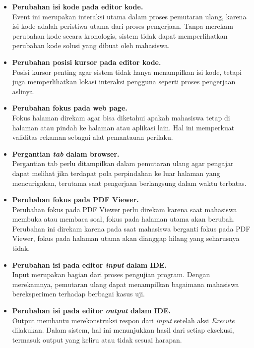 \begin{itemize}
    \item \textbf{Perubahan isi kode pada editor kode.} \\
    Event ini merupakan interaksi utama dalam proses pemutaran ulang, karena isi kode adalah peristiwa utama dari proses pengerjaan. Tanpa merekam perubahan kode secara kronologis, sistem tidak dapat memperlihatkan perubahan kode solusi yang dibuat oleh mahasiswa.

    \item \textbf{Perubahan posisi kursor pada editor kode.} \\
    Posisi kursor penting agar sistem tidak hanya menampilkan isi kode, tetapi juga memperlihatkan lokasi interaksi pengguna seperti proses pengerjaan aslinya.
      
    \item \textbf{Perubahan fokus pada web page.} \\
    Fokus halaman direkam agar bisa diketahui apakah mahasiswa tetap di halaman atau pindah ke halaman atau aplikasi lain. Hal ini memperkuat validitas rekaman sebagai alat pemantauan perilaku.

    \item \textbf{Pergantian \textit{tab} dalam browser.} \\
    Pergantian tab perlu ditampilkan dalam pemutaran ulang agar pengajar dapat melihat jika terdapat pola perpindahan ke luar halaman yang mencurigakan, terutama saat pengerjaan berlangsung dalam waktu terbatas.

    \item \textbf{Perubahan fokus pada PDF Viewer.} \\
    Perubahan fokus pada PDF Viewer perlu direkam karena saat mahasiswa membuka atau membaca soal, fokus pada halaman utama akan berubah. Perubahan ini direkam karena pada saat mahasiswa berganti fokus pada PDF Viewer, fokus pada halaman utama akan dianggap hilang yang seharusnya tidak.

    \item \textbf{Perubahan isi pada editor \textit{input} dalam IDE.} \\
    Input merupakan bagian dari proses pengujian program. Dengan merekamnya, pemutaran ulang dapat menampilkan bagaimana mahasiswa bereksperimen terhadap berbagai kasus uji.

    \item \textbf{Perubahan isi pada editor \textit{output} dalam IDE.} \\
    Output membantu merekonstruksi respon dari \textit{input} setelah aksi \textit{Execute} dilakukan. Dalam sistem, hal ini menunjukkan hasil dari setiap eksekusi, termasuk output yang keliru atau tidak sesuai harapan.


\end{itemize}
